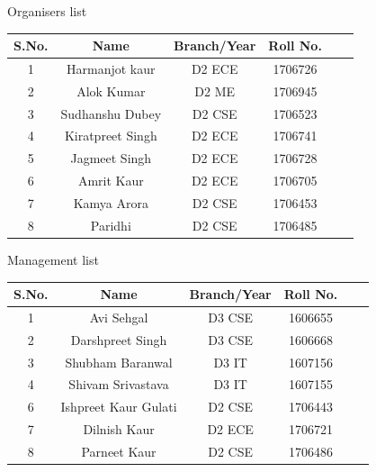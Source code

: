 \documentclass[12pt, a4 paper]{article}
\begin{document}
\newpage

\begin{center}
\huge Organisers list
\end{center}

\begin{table}[h!]
  \begin{center}
    \begin{tabular}{|c|c|c|c|c|c|} 
    \toprule %
      \textbf{S.No.} & \textbf{Name} & \textbf{Branch/Year} & \textbf{Roll No.} \\
      \midrule %
      1 & Harmanjot kaur & D2 ECE & 1706726 \\
      2 & Alok Kumar  & D2 ME & 1706945  \\
      3 & Sudhanshu Dubey & D2 CSE & 1706523  \\
      4 & Kiratpreet Singh & D2 ECE & 1706741 \\
      5 & Jagmeet Singh  & D2 ECE & 1706728 \\
      6 & Amrit Kaur  & D2 ECE  & 1706705     \\
      7 & Kamya Arora & D2 CSE  & 1706453   \\
      8 & Paridhi     & D2 CSE  & 1706485  \\

      \bottomrule %
    \end{tabular}
  \end{center}
\end{table}


\begin{center}
\huge Management list
\end{center}

\begin{table}[h!]
  \begin{center}
    \begin{tabular}{|c|c|c|c|c|c|} 
    \toprule %
      \textbf{S.No.} & \textbf{Name} & \textbf{Branch/Year} & \textbf{Roll No.} \\
      \midrule %
      1 & Avi Sehgal           & D3 CSE & 1606655 \\
      2 & Darshpreet Singh     & D3 CSE & 1606668 \\
      3 & Shubham Baranwal     & D3 IT  & 1607156 \\
      4 & Shivam Srivastava    & D3 IT  & 1607155 \\
      6 & Ishpreet Kaur Gulati & D2 CSE & 1706443 \\
      7 & Dilnish Kaur         & D2 ECE & 1706721 \\
      8 & Parneet Kaur         & D2 CSE & 1706486 \\

      \bottomrule %
    \end{tabular}
  \end{center}
\end{table}
\end{document}
